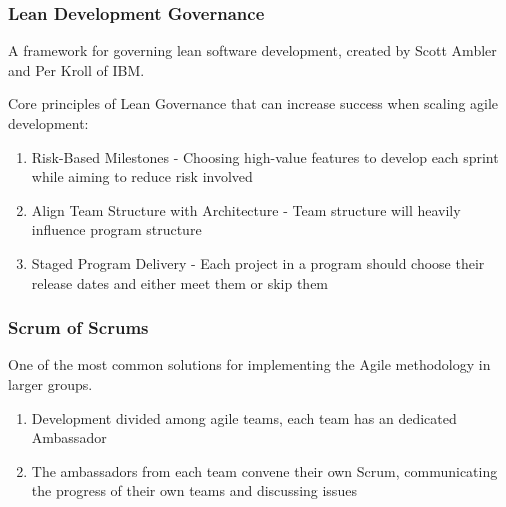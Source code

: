 \documentclass{beamer}
\begin{document}
\begin{frame}
	\frametitle{Lean Development Governance}
	
	A framework for governing lean software development, created by Scott Ambler and Per Kroll of IBM.
	
	\vspace{5mm}
	
	Core principles of Lean Governance that can increase success when scaling agile development:		
	
	\vspace{3mm}
	
	\begin{enumerate}
		\item Risk-Based Milestones - Choosing high-value features to develop each sprint while aiming to reduce risk involved
		\item Align Team Structure with Architecture - Team structure will heavily influence program structure
		\item Staged Program Delivery - Each project in a program should choose their release dates and either meet them or skip them
	\end{enumerate}


\end{frame}


\begin{frame}
	\frametitle{Scrum of Scrums}
	
	One of the most common solutions for implementing the Agile methodology in larger groups.
			
	\vspace{5mm}		
			
	\begin{enumerate}
		\item Development divided among agile teams, each team has an dedicated Ambassador
		\item The ambassadors from each team convene their own Scrum, communicating the progress of their own teams and discussing issues
	\end{enumerate}
	
\end{frame}
\end{document}
